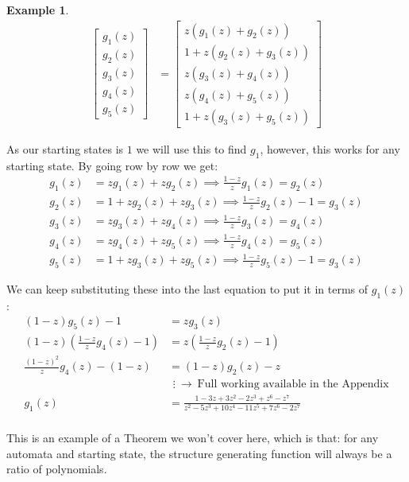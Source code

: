 \documentclass[a4paper]{article}
\theoremstyle{definition}
\theoremstyle{definition}
\newtheorem{example}{Example}[section]
\theoremstyle{definition}
\begin{document}
\begin{example}
\begin{align*}
        \begin{bmatrix}
           g_1(z) \\
           g_2(z) \\
           g_3(z) \\
           g_4(z) \\
           g_5(z)
         \end{bmatrix} &= \begin{bmatrix}
           z(g_1(z) + g_2(z)) \\
           1 + z(g_2(z) + g_3(z)) \\
           z(g_3(z) + g_4(z)) \\
           z(g_4(z) + g_5(z)) \\
           1 + z(g_3(z) + g_5(z))
         \end{bmatrix}
    \end{align*}

    As our starting states is \(1\) we will use this to find \(g_1\), however, this works for any starting state. By going row by row we get:
    \begin{align*}
        g_1(z) &= zg_1(z) + zg_2(z) \implies \frac{1 - z}{z}g_1(z) = g_2(z) \\
        g_2(z) &= 1 + zg_2(z) + zg_3(z) \implies \frac{1 - z}{z}g_2(z) - 1 = g_3(z) \\
        g_3(z) &= zg_3(z) + zg_4(z) \implies \frac{1 - z}{z}g_3(z) = g_4(z) \\
        g_4(z) &= zg_4(z) + zg_5(z) \implies \frac{1 - z}{z}g_4(z) = g_5(z) \\
        g_5(z) &= 1 + zg_3(z) + zg_5(z) \implies \frac{1 - z}{z}g_5(z) - 1 = g_3(z)
    \end{align*}

    \noindent We can keep substituting these into the last equation to put it in terms of \(g_1(z)\):
    \begin{align*}
        (1 - z)g_5(z) - 1 &= zg_3(z) \\
        (1 - z)\left(\frac{1 - z}{z}g_4(z) - 1\right)
            &= z\left(\frac{1 - z}{z}g_2(z) - 1\right) \\
        \frac{(1 - z)^2}{z}g_4(z) - (1 - z) &= (1 - z)g_2(z) - z \\
        &~\,\vdots ~\longrightarrow~ \text{Full working available in the Appendix}\\
        g_1(z)
            &= \frac{1 - 3z + 3z^2 - 2z^3 + z^6 - z^7}
            {z^2 - 5z^3 + 10z^4 - 11z^5 + 7z^6 - 2z^7} \\
    \end{align*}

    This is an example of a Theorem we won't cover here, which is that: for any automata and starting state, the structure generating function will always be a ratio of polynomials.
\end{example}
\end{document}
